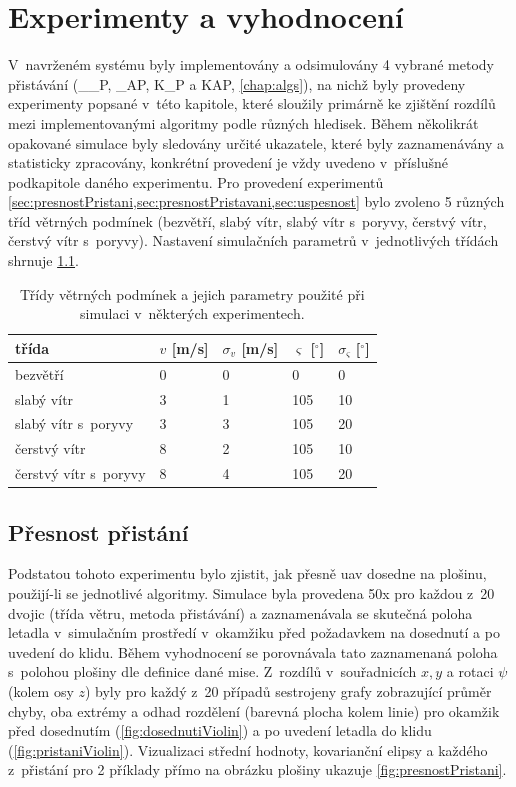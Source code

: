 \chapter{Experimenty a vyhodnocení} \label{chap:eval}
  V~navrženém systému byly implementovány a odsimulovány 4 vybrané metody přistávání (\_\_P, \_AP, K\_P a KAP, \cref{chap:algs}), na nichž byly provedeny experimenty popsané v~této kapitole, které sloužily primárně ke zjištění rozdílů mezi implementovanými algoritmy podle různých hledisek. Během několikrát opakované simulace byly sledovány určité ukazatele, které byly zaznamenávány a statisticky zpracovány, konkrétní provedení je vždy uvedeno v~příslušné podkapitole daného experimentu. Pro provedení experimentů \cref*{sec:presnostPristani,sec:presnostPristavani,sec:uspesnost} bylo zvoleno 5 různých tříd větrných podmínek (bezvětří, slabý vítr, slabý vítr s~poryvy, čerstvý vítr, čerstvý vítr s~poryvy). Nastavení simulačních parametrů v~jednotlivých třídách shrnuje \cref{tab:tridyVetru}.
  \begin{table}[H]
    \centering
    \begin{tabular}{@{}lllll@{}}
      \hline
      třída & $v$ [m/s] & $\sigma_v$ [m/s] & $\varsigma$ [$^{\circ}$] & $\sigma_\varsigma$ [$^{\circ}$] \bigstrut\\
      \hline
      bezvětří & 0     & 0     & 0     & 0 \bigstrut[t]\\
      slabý vítr & 3     & 1     & 105   & 10 \\
      slabý vítr s~poryvy & 3     & 3     & 105   & 20 \\
      čerstvý vítr & 8     & 2     & 105   & 10 \\
      čerstvý vítr s~poryvy & 8     & 4     & 105   & 20 \bigstrut[b]\\
      \hline
      \end{tabular}%
    \caption[Třídy větrných podmínek]{Třídy větrných podmínek a jejich parametry použité při simulaci v~některých experimentech.}
    \label{tab:tridyVetru}
  \end{table}
  \section{Přesnost přistání} \label{sec:presnostPristani}
    
    Podstatou tohoto experimentu bylo zjistit, jak přesně \acrshort{uav} dosedne na plošinu, použijí-li se jednotlivé algoritmy. Simulace byla provedena 50x pro každou z~20 dvojic (třída větru, metoda přistávání) a zaznamenávala se skutečná poloha letadla v~simulačním prostředí v~okamžiku před požadavkem na dosednutí a po uvedení do klidu. Během vyhodnocení se porovnávala tato zaznamenaná poloha s~polohou plošiny dle definice dané mise. Z~rozdílů v~souřadnicích $x, y$ a rotaci $\psi$ (kolem osy $z$) byly pro každý z~20 případů sestrojeny grafy zobrazující průměr chyby, oba extrémy a odhad rozdělení (barevná plocha kolem linie) pro okamžik před dosednutím (\cref{fig:dosednutiViolin}) a po uvedení letadla do klidu (\cref{fig:pristaniViolin}). Vizualizaci střední hodnoty, kovarianční elipsy a každého z~přistání pro 2 příklady přímo na obrázku plošiny ukazuje \cref{fig:presnostPristani}.

